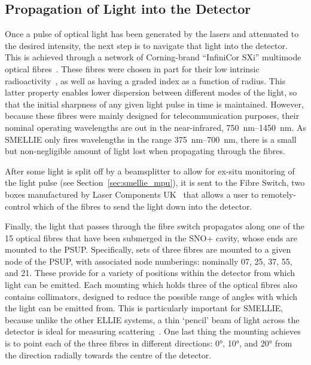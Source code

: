 \begin{figure}
    \centering
    \caption[]{}
    \label{fig:pq_new_intensity_dependence}
\end{figure}

\subsection{Propagation of Light into the Detector}\label{sec:smellie_fibres}
Once a pulse of optical light has been generated by the lasers and attenuated to the desired intensity, the next step is to navigate that light into the detector. This is achieved through a network of Corning-brand ``InfiniCor SXi'' multimode optical fibres~\cite{}. %
These fibres were chosen in part for their low intrinsic radioactivity~\cite{}, %
as well as having a graded index as a function of radius. This latter property enables lower dispersion between different modes of the light, so that the initial sharpness of any given light pulse in time is maintained. However, because these fibres were mainly designed for telecommunication purposes, their nominal operating wavelengths are out in the near-infrared, \SIrange{750}{1450}{\nm}. As SMELLIE only fires wavelengths in the range \SIrange{375}{700}{\nm}, there is a small but non-negligible amount of light lost when propagating through the fibres.

After some light is split off by a beamsplitter to allow for ex-situ monitoring of the light pulse (see Section~\ref{sec:smellie_mpu}), it is sent to the Fibre Switch, two boxes manufactured by Laser Components UK~\cite{} %
that allows a user to remotely-control which of the fibres to send the light down into the detector.

Finally, the light that passes through the fibre switch propagates along one of the 15 optical fibres that have been submerged in the SNO+ cavity, whose ends are mounted to the PSUP. Specifically, sets of three fibres are mounted to a given node of the PSUP, with associated node numberings: nominally 07, 25, 37, 55, and 21. These provide for a variety of positions within the detector from which light can be emitted. Each mounting which holds three of the optical fibres also contains collimators, designed to reduce the possible range of angles with which the light can be emitted from. This is particularly important for SMELLIE, because unlike the other ELLIE systems, a thin `pencil' beam of light across the detector is ideal for measuring scattering~\cite{majumdarMeasurementOpticalScattering2015}. %
One last thing the mounting achieves is to point each of the three fibres in different directions: \ang{0}, \ang{10}, and \ang{20} from the direction radially towards the centre of the detector.

